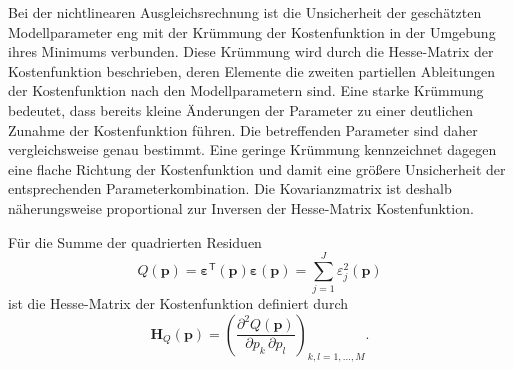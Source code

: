 Bei der nichtlinearen Ausgleichsrechnung ist die Unsicherheit der geschätzten
Modellparameter eng mit der Krümmung der Kostenfunktion in der Umgebung ihres
Minimums verbunden. Diese Krümmung wird durch die Hesse-Matrix der Kostenfunktion beschrieben,
deren Elemente die zweiten partiellen Ableitungen der Kostenfunktion nach den
Modellparametern sind. Eine starke Krümmung bedeutet, dass bereits kleine
Änderungen der Parameter zu einer deutlichen Zunahme der Kostenfunktion führen.
Die betreffenden Parameter sind daher vergleichsweise genau bestimmt. Eine
geringe Krümmung kennzeichnet dagegen eine flache Richtung der Kostenfunktion
und damit eine größere Unsicherheit der entsprechenden Parameterkombination.
Die Kovarianzmatrix ist deshalb näherungsweise proportional zur Inversen der
Hesse-Matrix Kostenfunktion.

Für die Summe der quadrierten Residuen
\begin{equation*}
Q(\mathbf p)
=
\boldsymbol{\varepsilon}^{\mathsf T}(\mathbf p)
\boldsymbol{\varepsilon}(\mathbf p)
=
\sum_{j=1}^{J} \varepsilon_j^2(\mathbf p)
\end{equation*}
ist die Hesse-Matrix der Kostenfunktion definiert durch
\begin{equation}
\boldsymbol H_Q(\mathbf p)
=
\left(
\frac{\partial^2 Q(\mathbf p)}
     {\partial p_k\,\partial p_l}
\right)_{k,l=1,\ldots,M}.
\label{eq:Hessematrix}
\end{equation}



